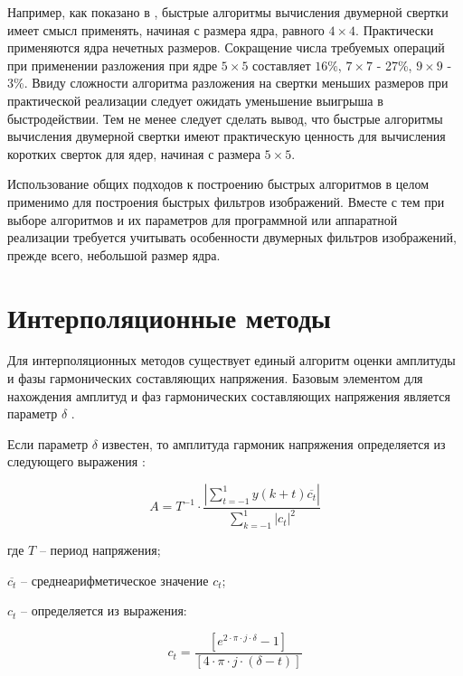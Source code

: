 Например, как показано в \cite{altman2015fast}, быстрые алгоритмы вычисления двумерной свертки
имеет смысл применять, начиная с размера ядра, равного $4\times4$. Практически применяются ядра нечетных размеров. Сокращение числа требуемых операций при применении разложения при ядре $5\times5$ составляет $16\%$, $7 \times 7 $ - 27\%, $9 \times 9$ - 3\%. Ввиду сложности
алгоритма разложения на свертки меньших размеров при практической реализации следует ожидать уменьшение выигрыша в быстродействии. Тем не менее следует сделать вывод, что быстрые алгоритмы вычисления двумерной свертки имеют практическую ценность для вычисления коротких сверток для ядер, начиная с размера $5\times5$.

Использование общих подходов к построению быстрых алгоритмов в целом применимо для построения быстрых фильтров изображений. Вместе с тем при выборе алгоритмов и их параметров для программной или аппаратной реализации требуется учитывать особенности двумерных фильтров изображений, прежде всего, небольшой размер ядра.
	
\section{Интерполяционные методы} \label{sec:ch3/sect2}
Для интерполяционных методов существует единый алгоритм оценки амплитуды и фазы гармонических составляющих напряжения. Базовым элементом для нахождения амплитуд и фаз гармонических составляющих напряжения является параметр $\delta$ \cite{558515}. 

Если параметр $\delta$ известен, то амплитуда гармоник напряжения определяется из следующего выражения \cite{558515}:

\begin{equation}
	\label{eq:equation3.11}
	A = T^{-1} \cdot \frac{\left|{\displaystyle\sum_{t=-1}^{1} y(k+t)\overline{c_t}} \right| }{\displaystyle\sum_{k=-1}^{1}|c_t|^2}
\end{equation}

где $T$ – период напряжения;

$\overline{c_t}$ – среднеарифметическое значение $c_t$;

$c_t$ – определяется из выражения:

\begin{equation}
	\label{eq:equation3.12}
	c_t = \frac{[e^{2 \cdot \pi \cdot j \cdot \delta} - 1]}{[4 \cdot \pi \cdot j \cdot (\delta - t)]}
\end{equation}

